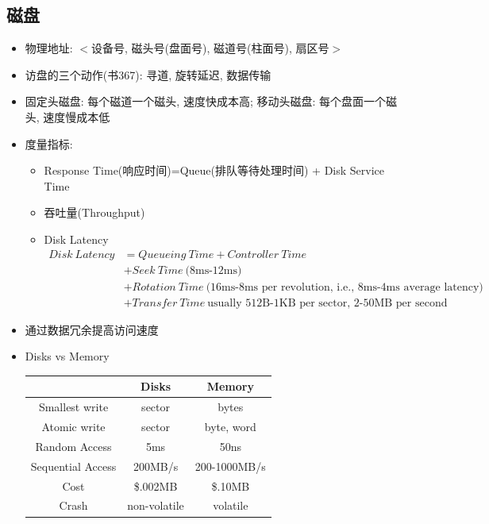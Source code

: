 \documentclass[a4paper, UTF8]{article}
\begin{document}
\subsection{磁盘}
\begin{itemize}
\item 物理地址: $<$设备号, 磁头号(盘面号), 磁道号(柱面号), 扇区号$>$
\item 访盘的三个动作(书367): 寻道, 旋转延迟, 数据传输
\item 固定头磁盘: 每个磁道一个磁头, 速度快成本高; 移动头磁盘: 每个盘面一个磁头, 速度慢成本低
\item 度量指标: 
	\begin{itemize}
	\item Response Time(响应时间)=Queue(排队等待处理时间) + Disk Service Time
	\item 吞吐量(Throughput)
	\item Disk Latency
		\begin{align*}
		Disk\ Latency &= Queueing\ Time + Controller\ Time \\
		&+ Seek\ Time\ \mbox{(8ms-12ms)} \\
		&+ Rotation\ Time\ \mbox{(16ms-8ms per revolution, i.e., 8ms-4ms average latency)} \\
		&+ Transfer\ Time\ \mbox{usually 512B-1KB per sector, 2-50MB per second}
		\end{align*}
	\end{itemize}
\item 通过数据冗余提高访问速度
\item Disks vs Memory\\
	\begin{tabular}{|c|c|c|}
	\hline
	 & Disks & Memory \\
	\hline
	Smallest write & sector & bytes \\
	\hline
	Atomic write & sector & byte, word \\
	\hline
	Random Access & 5ms & 50ns \\
	\hline
	Sequential Access & 200MB/s & 200-1000MB/s \\
	\hline
	Cost & \$.002MB & \$.10MB \\
	\hline
	Crash & non-volatile & volatile \\
	\hline
	\end{tabular}
\end{itemize}
\end{document}
